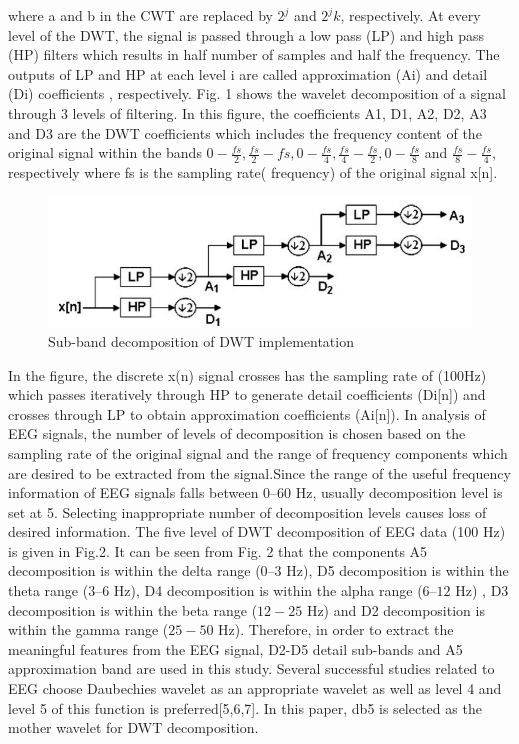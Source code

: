 \documentclass[12pt,letterpaper]{article}
\begin{document}
where a and b in the CWT are replaced by $2^j$ and $2^jk$, respectively.
At every level of the DWT, the signal is  passed through a low pass (LP) and high pass (HP) filters which results in half number of samples and half the frequency. The outputs of LP and HP at each level i are called approximation (Ai) and detail (Di) coefficients , respectively. Fig. 1 shows the wavelet decomposition of a signal through 3 levels of filtering. In this figure, the coefficients A1, D1, A2, D2, A3 and D3 are the DWT coefficients which includes the frequency content of the original signal within the
bands ${0-\frac{fs}{2}},{\frac{fs}{2}-fs}, {0-\frac{fs}{4}}, {\frac{fs}{4}-\frac{fs}{2}},{ 0-\frac{fs}{8}}$ and ${\frac{fs}{8}-\frac{fs}{4}}$, respectively where fs is the sampling rate( frequency) of the original signal x[n].\\
\begin{figure}

\includegraphics[width=1\textwidth]{graph.png}

\caption{Sub-band decomposition of DWT implementation}
\end{figure}
In the figure, the discrete x(n) signal crosses has the sampling rate of (100Hz) which passes iteratively through HP to generate detail coefficients (Di[n]) and crosses through LP to obtain approximation
coefficients (Ai[n]). In analysis of EEG signals, the number of levels of decomposition is chosen based on the sampling rate of the original signal and the range of frequency components which are desired to be extracted from the signal.Since the range of the useful frequency information of  EEG signals falls between $0–60$ Hz, usually decomposition level is set at 5. Selecting inappropriate number of decomposition levels causes loss of desired information.
The five level of DWT decomposition of EEG data (100 Hz) is given in Fig.2. It can be seen from Fig. 2 that the components A5 decomposition is within the delta range ($0–3$ Hz), D5 decomposition is within the theta range ($3–6$ Hz), D4 decomposition is within the alpha range ($6–12$ Hz) , D3 decomposition is within the beta range ($12-25$ Hz) and D2 decomposition is within the gamma range ($25-50$ Hz).  Therefore, in order to extract the meaningful features from the EEG signal, D2-D5 detail sub-bands and A5 approximation band are used in this study. Several successful studies related to EEG choose Daubechies wavelet as an appropriate wavelet as well as level 4 and level 5 of this function is preferred[5,6,7]. In this paper, db5 is selected as the mother wavelet for DWT decomposition. 
\end{document}
